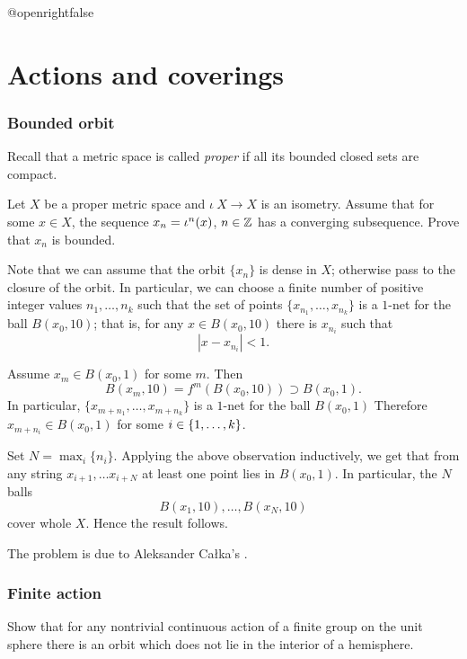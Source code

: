 \csname @openrightfalse\endcsname
\chapter{Actions and coverings}

\subsection*{Bounded orbit}
\label{Bounded orbit}

Recall that a metric space is called \emph{proper} if all its bounded closed sets are compact.

\begin{pr} Let $X$ be a 
proper metric space 
and $\iota\:X\to X$ is an isometry.
Assume that for some $x\in X$, the sequence $x_n\z=\iota^n(x)$, $n\in\mathbb{Z}$ has a converging subsequence.
Prove that $x_n$ is bounded.
\end{pr}

Note that we can assume that the orbit $\{x_n\}$ is dense in $X$;
otherwise pass to the closure of the orbit.
In particular, we can choose a finite number of positive integer values $n_1,\dots,n_k$
such that the set of points $\{x_{n_1},\dots,x_{n_k}\}$ is a $1$-net for the ball $B(x_0,10)$;
that is, for any $x\in B(x_0,10)$ there is $x_{n_i}$ such that
\[|x-x_{n_i}|<1.\]

Assume $x_m\in B(x_0,1)$ for some $m$.
Then 
\[B(x_m,10)=f^m( B(x_0,10))\supset B(x_0,1).\] 
In particular, $\{x_{m+n_1},\dots,x_{m+n_k}\}$ is a $1$-net for the ball $B(x_0,1)$
Therefore $x_{m+n_i}\in B(x_0,1)$ for some $i\z\in\{1,\dots,k\}$.

Set $N=\max_i\{n_i\}$.
Applying the above observation inductively, we get that from any string $x_{i+1},\dots x_{i+N}$
at least one point lies in $B(x_0,1)$.
In particular, the $N$ balls
\[B(x_1,10),\dots,B(x_N,10)\]
cover whole $X$.
Hence the result follows.\qeds

The problem is due to Aleksander Ca{\l}ka's \cite[see][]{calka}.

\subsection*{Finite action}\label{Finite action}

\begin{pr}
Show that for any nontrivial continuous action of a finite group on the unit sphere
there is an orbit which does not lie in the interior of a hemisphere.
\end{pr}

